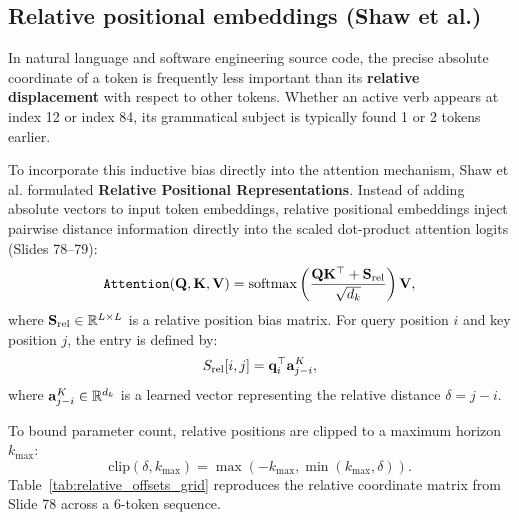 \documentclass[../../main.tex]{subfiles}
\begin{document}
\subsection{Relative positional embeddings (Shaw et al.)}
\label{subsec:relative_positional_embeddings_shaw}

In natural language and software engineering source code, the precise absolute coordinate of a token is frequently less important than its \textbf{relative displacement} with respect to other tokens. Whether an active verb appears at index 12 or index 84, its grammatical subject is typically found 1 or 2 tokens earlier.

To incorporate this inductive bias directly into the attention mechanism, Shaw et al. \cite{shaw2018} formulated \textbf{Relative Positional Representations}. Instead of adding absolute vectors to input token embeddings, relative positional embeddings inject pairwise distance information directly into the scaled dot-product attention logits (Slides 78--79):
\begin{equation}
\label{eq:relative_position_attention_ch5}
\text{\texttt{Attention}}(\mathbf{Q}, \mathbf{K}, \mathbf{V}) = \operatorname{\mathrm{softmax}}\left( \frac{\mathbf{Q} \mathbf{K}^\top + \mathbf{S}_{\text{rel}}}{\sqrt{d_k}} \right) \mathbf{V},
\end{equation}
where $\mathbf{S}_{\text{rel}} \in \mathbb{R}^{L \times L}$ is a relative position bias matrix. For query position $i$ and key position $j$, the entry is defined by:
\begin{equation}
\label{eq:shaw_s_rel_entry}
S_{\text{rel}}[i, j] = \mathbf{q}_i^\top \mathbf{a}_{j-i}^K,
\end{equation}
where $\mathbf{a}_{j-i}^K \in \mathbb{R}^{d_k}$ is a learned vector representing the relative distance $\delta = j - i$.

To bound parameter count, relative positions are clipped to a maximum horizon $k_{\max}$:
\begin{equation}
\label{eq:clipping_function_shaw}
\text{clip}(\delta, k_{\max}) = \max(-k_{\max}, \min(k_{\max}, \delta)).
\end{equation}
Table~\ref{tab:relative_offsets_grid} reproduces the relative coordinate matrix from Slide 78 across a 6-token sequence.
\end{document}
